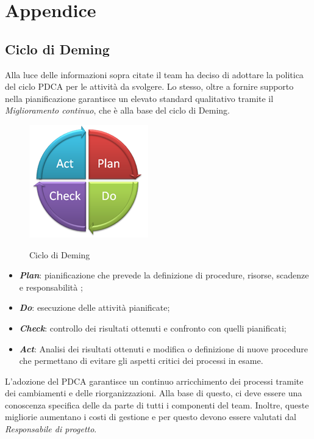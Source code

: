 \section{Appendice}
\subsection{Ciclo di Deming}
Alla luce delle informazioni sopra citate il team ha deciso di adottare la politica del ciclo PDCA per le attività da svolgere. Lo stesso, oltre a fornire supporto nella pianificazione garantisce un elevato standard qualitativo tramite il \textit{Miglioramento continuo}, che è alla base del ciclo di Deming.
\begin{figure}[H]
\centering
     \includegraphics[scale=1]{../modello/img/pdca}\\
     \caption{Ciclo di Deming}\label{fig:1}
\end{figure}
\begin{itemize}
\item \textbf{\textit{Plan}}: pianificazione che prevede la definizione di procedure, risorse, scadenze e responsabilità ;
\item \textbf{\textit{Do}}: esecuzione delle attività pianificate; 
\item \textbf{\textit{Check}}: controllo dei risultati ottenuti e confronto con quelli pianificati;
\item \textbf{\textit{Act}}: Analisi dei risultati ottenuti e modifica o definizione di nuove procedure che permettano di evitare gli aspetti critici dei processi in esame.
\end{itemize}
L'adozione del PDCA garantisce un continuo arricchimento dei processi tramite dei cambiamenti e delle riorganizzazioni. Alla base di questo, ci deve essere una conoscenza specifica delle \infoNDP{} da parte di tutti i componenti del team. Inoltre, queste migliorie aumentano i costi di gestione e per questo devono essere valutati dal \textit{Responsabile di progetto}.
